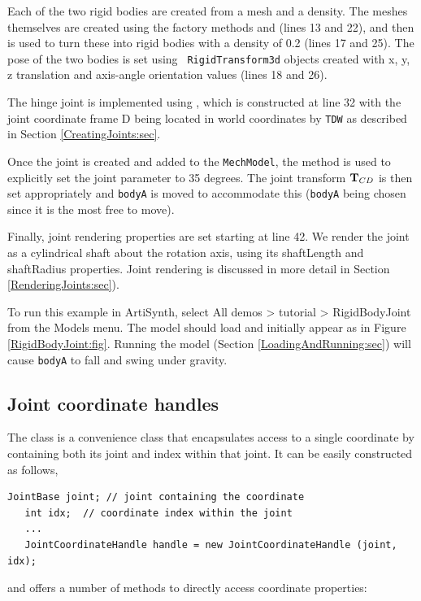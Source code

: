 Each of the two rigid bodies are created from a mesh and a density.
The meshes themselves are created using the factory methods
 and
(lines 13 and 22), and then
 is
used to turn these into rigid bodies with a density of 0.2 (lines 17
and 25). The pose of the two bodies is set using {\tt
RigidTransform3d} objects created with x, y, z translation and
axis-angle orientation values (lines 18 and 26).

The hinge joint is implemented using
, which is
constructed at line 32 with the joint coordinate frame D being located
in world coordinates by {\tt TDW} 
as described in Section \ref{CreatingJoints:sec}.

Once the joint is created and added to the {\tt MechModel}, the method
 is
used to explicitly set the joint parameter to 35 degrees. The joint
transform ${\bf T}_{CD}$ is then set appropriately and {\tt bodyA} is moved
to accommodate this ({\tt bodyA} being chosen since it is the most
free to move).

Finally, joint rendering properties are set starting at line 42. We
render the joint as a cylindrical shaft about the rotation axis, using
its {\sf shaftLength} and {\sf shaftRadius} properties. Joint
rendering is discussed in more detail in
Section \ref{RenderingJoints:sec}).

To run this example in ArtiSynth, select {\sf All demos > tutorial >
RigidBodyJoint} from the {\sf Models} menu. The model should load and
initially appear as in Figure \ref{RigidBodyJoint:fig}.  Running the
model (Section \ref{LoadingAndRunning:sec}) will cause {\tt bodyA} to
fall and swing under gravity.

\subsection{Joint coordinate handles}
\label{JointCoordinateHandles:sec}

The class  is a convenience class that
encapsulates access to a single coordinate by containing both its joint and
index within that joint. It can be easily constructed as follows,
%
\begin{lstlisting}[]
   JointBase joint; // joint containing the coordinate
   int idx;  // coordinate index within the joint
   ...
   JointCoordinateHandle handle = new JointCoordinateHandle (joint, idx);
\end{lstlisting}
%
and offers a number of methods to directly access coordinate properties:

